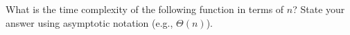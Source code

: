 \begin{prob}
    What is the time complexity of the following function in terms of $n$?
    State your answer using asymptotic notation (e.g., $\Theta(n)$).

    \inputminted[lastline=7]{python}{\thisdir/code.py}


\end{prob}
